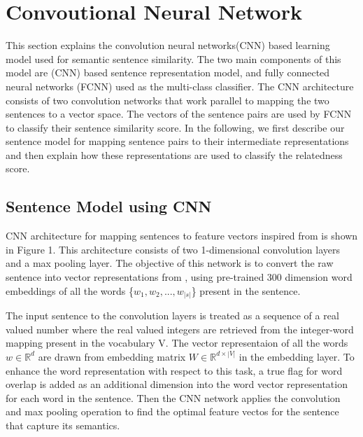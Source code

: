 \documentclass[12pt]{report} %
\begin{document}
\section{Convoutional Neural Network}
	This section explains the convolution neural networks(CNN) based learning model used for semantic sentence similarity. The two main components of this model are (CNN) based sentence representation model, and fully connected neural networks (FCNN) used as the multi-class classifier. The CNN architecture consists of two convolution networks that work parallel to mapping the two sentences to a vector space. The vectors of the sentence pairs are used by FCNN to classify their sentence similarity score. In the following, we first describe our sentence model for mapping sentence pairs to their intermediate representations and then explain how these representations are used to classify the relatedness score.
	
	\subsection{Sentence Model using CNN}
	CNN architecture for mapping sentences to feature
	vectors inspired from \cite{shao2017hcti} is shown in Figure 1. This architecture consists of two 1-dimensional convolution layers and a max pooling layer. The objective of this network is to convert the raw sentence into vector representations from \cite{pennington2014glove}, using pre-trained 300 dimension word embeddings of all the words \{$w_{1}, w_{2},...,w_{|s|}$\} present in the sentence.
	
	The input sentence to the convolution layers is treated as a sequence of a real valued number where the real valued integers are retrieved from the integer-word mapping present in the vocabulary V. The vector representaion of all the words $ w \in \mathbb{R}^{d}  $ are drawn from embedding matrix  $ W \in \mathbb{R}^{d \times |V|} $ in the embedding layer. To enhance the word representation with respect to this task, a true flag for word overlap is added as an additional dimension into the word vector representation for each word in the sentence. Then the CNN network applies the convolution and max pooling operation to find the optimal feature vectos for the sentence that capture its semantics. 
	
\end{document}
